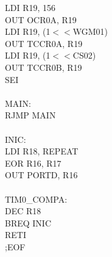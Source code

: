 \documentclass[titlepage, a4paper, 10pt, reqno, openany]{report}
\begin{document}
\begin{minipage}[T]{.3\linewidth}
\hspace*{.5cm}	LDI R19, 156 \\
\hspace*{.5cm}	OUT OCR0A, R19 \\
\hspace*{.5cm}	LDI R19, (1$<<$WGM01) \\
\hspace*{.5cm}	OUT TCCR0A, R19 \\
\hspace*{.5cm}	LDI R19, (1$<<$CS02) \\
\hspace*{.5cm}	OUT TCCR0B, R19 \\
\hspace*{.5cm}	SEI \\
\hspace*{.5cm}	\\
MAIN: \\
\hspace*{.5cm}	RJMP MAIN \\
\hspace*{.5cm}	\\
INIC: \\
\hspace*{.5cm}	LDI R18, REPEAT \\
\hspace*{.5cm}	EOR R16, R17 \\
\hspace*{.5cm}	
\hspace*{.5cm}	OUT PORTD, R16 \\
\hspace*{.5cm}	\\
TIM0\_COMPA: \\
\hspace*{.5cm}	DEC R18 \\
\hspace*{.5cm}	BREQ INIC \\
\hspace*{.5cm}	RETI \\
;EOF \\
\end{minipage}
\qquad
\end{document}
